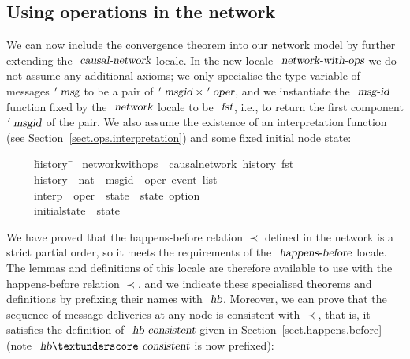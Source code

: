 \subsection{Using operations in the network}\label{sect.network.ops}

We can now include the convergence theorem into our network model by further extending the $\isa{causal-network}$ locale.
In the new locale $\isa{network-with-ops}$ we do not assume any additional axioms; we only specialise the type variable of messages $\isacharprime\isa{msg}$ to be a pair of $\isacharprime\isa{msgid} \mathbin{\isasymtimes} \isacharprime\isa{oper}$, and we instantiate the $\isa{msg-id}$ function fixed by the $\isa{network}$ locale to be $\isa{fst}$, i.e., to return the first component $\isacharprime\isa{msgid}$ of the pair.
We also assume the existence of an interpretation function (see Section~\ref{sect.ops.interpretation}) and some fixed initial node state:
\begin{isabelle}
~~~~\ \=history\ \=\kill
{}\ network{\isacharunderscore}with{\isacharunderscore}ops\ {\isacharequal}\ causal{\isacharunderscore}network\ history\ fst\\
~~~~\ \>history\ \>{\isacharcolon}{\isacharcolon}\ {\isachardoublequoteopen}nat\ {\isasymRightarrow}\ {\isacharparenleft}{\isacharprime}msgid\ {\isasymtimes}\ {\isacharprime}oper{\isacharparenright}\ event\ list{\isachardoublequoteclose}\ {\isacharplus}\\
~~~~\ \>interp\ \>{\isacharcolon}{\isacharcolon}\ {\isachardoublequoteopen}{\isacharprime}oper\ {\isasymRightarrow}\ {\isacharprime}state\ {\isasymRightarrow}\ {\isacharprime}state\ option{\isachardoublequoteclose}\\
~~~~\ \>initial{\isacharunderscore}state\ {\isacharcolon}{\isacharcolon}\ {\isachardoublequoteopen}{\isacharprime}state{\isachardoublequoteclose}
\end{isabelle}
We have proved that the happens-before relation $\prec$ defined in the network is a strict partial order, so it meets the requirements of the $\isa{happens-before}$ locale.
The lemmas and definitions of this locale are therefore available to use with the happens-before relation $\prec$, and we indicate these specialised theorems and definitions by prefixing their names with $\isa{hb}$.
Moreover, we can prove that the sequence of message deliveries at any node is consistent with $\prec$, that is, it satisfies the definition of $\isa{hb-consistent}$ given in Section~\ref{sect.happens.before} (note $\isa{hb}{\isacharunderscore}\isa{consistent}$ is now prefixed):
